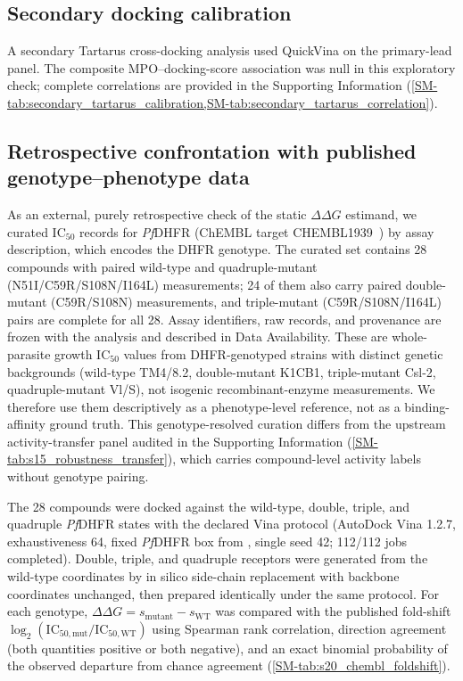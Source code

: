 \documentclass[journal=jcisd8,manuscript=article,layout=traditional]{achemso}
\begin{document}
\subsection{Secondary docking calibration}

A secondary Tartarus cross-docking analysis used QuickVina on the primary-lead panel. The composite MPO--docking-score association was null in this exploratory check; complete correlations are provided in the Supporting Information (\cref{SM-tab:secondary_tartarus_calibration,SM-tab:secondary_tartarus_correlation}).

\subsection{Retrospective confrontation with published genotype--phenotype data}

As an external, purely retrospective check of the static $\Delta\Delta G$ estimand, we curated IC$_{50}$ records for \textit{Pf}DHFR (ChEMBL target CHEMBL1939~\citep{zdrazil2024chembl}) by assay description, which encodes the DHFR genotype. The curated set contains 28 compounds with paired wild-type and quadruple-mutant (N51I/C59R/S108N/I164L) measurements; 24 of them also carry paired double-mutant (C59R/S108N) measurements, and triple-mutant (C59R/S108N/I164L) pairs are complete for all 28. Assay identifiers, raw records, and provenance are frozen with the analysis and described in Data Availability. These are whole-parasite growth IC$_{50}$ values from DHFR-genotyped strains with distinct genetic backgrounds (wild-type TM4/8.2, double-mutant K1CB1, triple-mutant Csl-2, quadruple-mutant Vl/S), not isogenic recombinant-enzyme measurements. We therefore use them descriptively as a phenotype-level reference, not as a binding-affinity ground truth. This genotype-resolved curation differs from the upstream activity-transfer panel audited in the Supporting Information (\cref{SM-tab:s15_robustness_transfer}), which carries compound-level activity labels without genotype pairing.

The 28 compounds were docked against the wild-type, double, triple, and quadruple \textit{Pf}DHFR states with the declared Vina protocol (AutoDock Vina 1.2.7, exhaustiveness \num{64}, fixed \textit{Pf}DHFR box from \citealt{Temgoua2026}, single seed \num{42}; \num{112}/\num{112} jobs completed). Double, triple, and quadruple receptors were generated from the wild-type coordinates by in silico side-chain replacement with backbone coordinates unchanged, then prepared identically under the same protocol. For each genotype, $\Delta\Delta G = s_{\mathrm{mutant}} - s_{\mathrm{WT}}$ was compared with the published fold-shift $\log_2(\mathrm{IC}_{50,\mathrm{mut}}/\mathrm{IC}_{50,\mathrm{WT}})$ using Spearman rank correlation, direction agreement (both quantities positive or both negative), and an exact binomial probability of the observed departure from chance agreement (\cref{SM-tab:s20_chembl_foldshift}).
\end{document}
